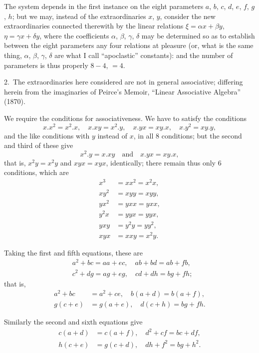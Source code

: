 \documentclass[11pt,a4paper]{book}
\begin{document}
The system depends in the first instance on the eight parameters $a$, $b$, $c$, $d$, $e$, $f$, $g$, $h$; but we may, instead of the extraordinaries $x$, $y$, consider the new extraordinaries connected therewith by the linear relations $\xi = \alpha x + \beta y$, $\eta = \gamma x + \delta y$, where the coefficients $\alpha$, $\beta$, $\gamma$, $\delta$ may be determined so as to establish between the eight parameters any four relations at pleasure (or, what is the same thing, $\alpha$, $\beta$, $\gamma$, $\delta$ are what I call ``apoclastic'' constants): and the number of parameters is thus properly $8 - 4$, $= 4$.

2.~The extraordinaries here considered are not in general associative; differing herein from the imaginaries of Peirce's Memoir, ``Linear Associative Algebra'' (1870).

We require the conditions for associativeness. We have to satisfy the conditions
\[
x.x^2 = x^2.x,\quad x.xy = x^2.y,\quad x.yx = xy.x,\quad x.y^2 = xy.y,
\]
and the like conditions with $y$ instead of $x$, in all 8 conditions; but the second and third of these give
\[
x^2.y = x.xy\quad\text{and}\quad x.yx = xy.x,
\]
that is, $x^2y = x^2y$ and $xyx = xyx$, identically; there remain thus only 6 conditions, which are
\begin{align*}
x^3 &= xx^2 = x^2x,\\
xy^2 &= xyy = xyy,\\
yx^2 &= yxx = yxx,\\
y^2x &= yyx = yyx,\\
yxy &= y^2y = yy^2,\\
xyx &= xxy = x^2y.
\end{align*}

Taking the first and fifth equations, these are
\begin{align*}
&a^2 + bc = aa + ec,\quad ab + bd = ab + fb,\\
&c^2 + dg = ag + eg,\quad cd + dh = bg + fh;
\end{align*}
that is,
\begin{align*}
a^2 + bc &= a^2 + ce,\quad b(a + d) = b(a + f),\\
g(c + e) &= g(a + e),\quad d(c + h) = bg + fh.
\end{align*}

Similarly the second and sixth equations give
\begin{align*}
c(a + d) &= c(a + f),\quad d^2 + cf = bc + df,\\
h(c + e) &= g(c + d),\quad dh + f^2 = bg + h^2.
\end{align*}
\end{document}
